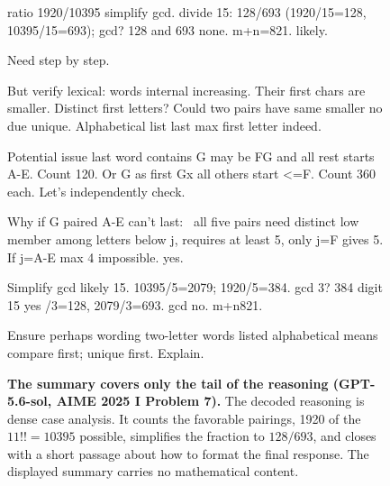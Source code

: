\begin{figure}[H]
\begin{reasoncol}[equal height group=sfE]
  ratio 1920/10395 simplify gcd. divide 15: 128/693 (1920/15=128, 10395/15=693); gcd? 128 and 693 none. m+n=821. likely.\par
  Need step by step.\par\vspace{2pt}
  But verify lexical: words internal increasing. Their first chars are smaller. Distinct first letters? Could two pairs have same smaller no due unique. Alphabetical list last max first letter indeed.\par\vspace{2pt}
  Potential issue last word contains G may be FG and all rest starts A-E. Count 120. Or G as first Gx all others start <=F. Count 360 each. Let's independently check. \elide\par\vspace{2pt}
  Why if G paired A-E can't last: \elide\ all five pairs need distinct low member among letters below j, requires at least 5, only j=F gives 5. If j=A-E max 4 impossible. yes.\par\vspace{2pt}
  Simplify gcd likely 15. 10395/5=2079; 1920/5=384. gcd 3? 384 digit 15 yes /3=128, 2079/3=693. gcd no. m+n821.\par\vspace{2pt}
   Ensure perhaps wording two-letter words listed alphabetical means compare first; unique first. Explain. 
\end{reasoncol}
\caption{\textbf{The summary covers only the tail of the reasoning
(GPT-5.6-sol, AIME 2025 I Problem 7).} The decoded reasoning is dense case
analysis. It counts the favorable pairings, 1920 of the \(11!!=10395\)
possible, simplifies the fraction to \(128/693\), and closes with a short
passage about how to format the final response. The displayed summary carries no mathematical content.}
\label{fig:sf_sol_meta}
\end{figure}
